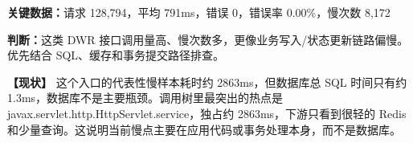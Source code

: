\noindent\textbf{关键数据：}请求 128,794，平均 791ms，错误 0，错误率 0.00\%，慢次数 8,172\par

\noindent\textbf{判断：}这类 DWR 接口调用量高、慢次数多，更像业务写入/状态更新链路偏慢。优先结合 SQL、缓存和事务提交路径排查。\par

\vspace{0.25em}

\noindent\textbf{【现状】} 这个入口的代表性慢样本耗时约 2863ms，但数据库总 SQL 时间只有约 1.3ms，数据库不是主要瓶颈。调用树里最突出的热点是 javax.servlet.http.HttpServlet.service，独占约 2863ms，下游只看到很轻的 Redis 和少量查询。这说明当前慢点主要在应用代码或事务处理本身，而不是数据库。\par

\vspace{0.4em}


